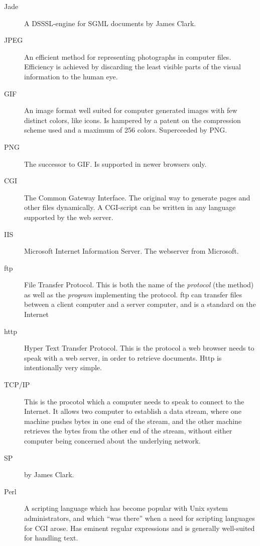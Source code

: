 \begin{description}
\item[Jade] A DSSSL-engine for SGML documents by James Clark.
  
\item[JPEG] An efficient method for representing photographs in
  computer files.  Efficiency is achieved by discarding the least
  visible parts of the visual information to the human eye.
  
\item[GIF] An image format well suited for computer generated images
  with few distinct colors, like icons.  Is hampered by a patent on
  the compression scheme used and a maximum of 256 colors.
  Superceeded by PNG.
  
\item[PNG] The successor to GIF.  Is supported in newer browsers
  only.
  
\item[CGI] The Common Gateway Interface.  The original way to generate
  pages and other files dynamically.  A CGI-script can be written in
  any language supported by the web server.

\item[IIS] Microsoft Internet Information Server.  The webserver from
  Microsoft. 
  
\item[ftp] File Transfer Protocol.  This is both the name of the
  \textit{protocol} (the method) as well as the \textit{program}
  implementing the protocol.  ftp can transfer files between a client
  computer and a server computer, and is a standard on the Internet
  
\item[http] Hyper Text Transfer Protocol.  This is the protocol a web
  browser needs to speak with a web server, in order to retrieve
  documents.  Http is intentionally very simple.
\item[TCP/IP] This is the procotol which a computer needs to speak to
  connect to the Internet.  It allows two computer to establish a data
  stream, where one machine pushes bytes in one end of the stream, and
  the other machine retrieves the bytes from the other end of the
  stream, without either computer being concerned about the underlying
  network.
  
\item[SP]  by James Clark.
  
\item[Perl] A scripting language which has become popular with Unix
  system administrators, and which ``was there'' when a need for
  scripting languages for CGI arose.  Has eminent regular expressions
  and is generally well-suited for handling text.
  

\end{description}
